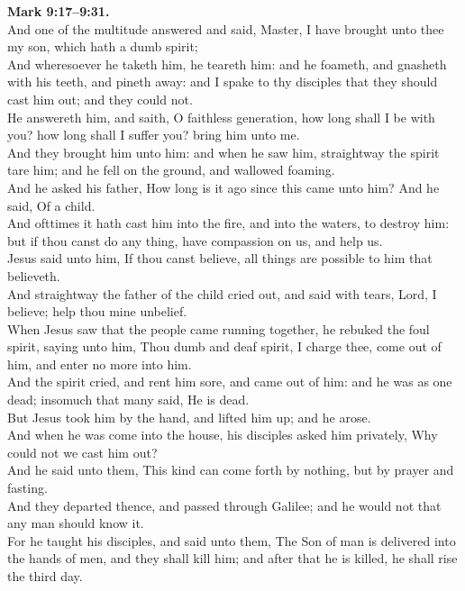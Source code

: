 \documentclass[10pt]{article} %
\begin{document}
{\begin{minipage}[t]{0.45\textwidth}
\textbf{Mark 9:17--9:31.}\\
And one of the multitude answered and said, Master, I have brought unto thee my son, which hath a dumb spirit;\\
And wheresoever he taketh him, he teareth him: and he foameth, and gnasheth with his teeth, and pineth away: and I spake to thy disciples that they should cast him out; and they could not.\\
He answereth him, and saith, O faithless generation, how long shall I be with you? how long shall I suffer you? bring him unto me.\\
And they brought him unto him: and when he saw him, straightway the spirit tare him; and he fell on the ground, and wallowed foaming.\\
And he asked his father, How long is it ago since this came unto him? And he said, Of a child.\\
And ofttimes it hath cast him into the fire, and into the waters, to destroy him: but if thou canst do any thing, have compassion on us, and help us.\\
Jesus said unto him, If thou canst believe, all things are possible to him that believeth.\\
And straightway the father of the child cried out, and said with tears, Lord, I believe; help thou mine unbelief.\\
When Jesus saw that the people came running together, he rebuked the foul spirit, saying unto him, Thou dumb and deaf spirit, I charge thee, come out of him, and enter no more into him.\\
And the spirit cried, and rent him sore, and came out of him: and he was as one dead; insomuch that many said, He is dead.\\
But Jesus took him by the hand, and lifted him up; and he arose.\\
And when he was come into the house, his disciples asked him privately, Why could not we cast him out?\\
And he said unto them, This kind can come forth by nothing, but by prayer and fasting.\\
And they departed thence, and passed through Galilee; and he would not that any man should know it.\\
For he taught his disciples, and said unto them, The Son of man is delivered into the hands of men, and they shall kill him; and after that he is killed, he shall rise the third day.\\

\end{minipage}}
\end{document}
